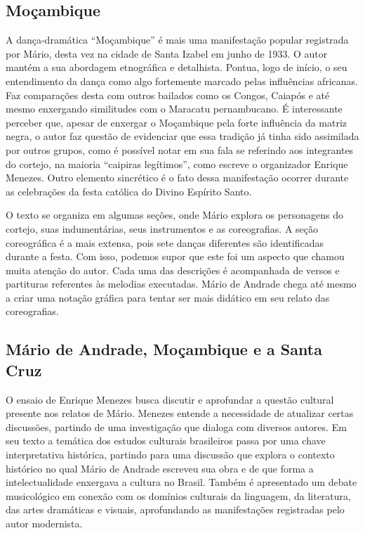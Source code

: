 \subsection{Moçambique}

A dança-dramática ``Moçambique'' é mais uma manifestação popular
registrada por Mário, desta vez na cidade de Santa Izabel em junho de
1933. O autor mantém a sua abordagem etnográfica e detalhista. Pontua,
logo de início, o seu entendimento da dança como algo fortemente marcado
pelas influências africanas. Faz comparações desta com outros bailados
como os Congos, Caiapós e até mesmo enxergando similitudes com o
Maracatu pernambucano. É interessante perceber que, apesar de enxergar o
Moçambique pela forte influência da matriz negra, o autor faz questão de
evidenciar que essa tradição já tinha sido assimilada por outros grupos,
como é possível notar em sua fala se referindo aos integrantes do
cortejo, na maioria ``caipiras
legítimos'', como escreve o organizador Enrique Menezes. Outro elemento sincrético é
o fato dessa manifestação ocorrer durante as celebrações da festa
católica do Divino Espírito Santo.

O texto se organiza em algumas seções, onde Mário explora os personagens
do cortejo, suas indumentárias, seus instrumentos e as coreografias. A
seção coreográfica é a mais extensa, pois sete danças diferentes são
identificadas durante a festa. Com isso, podemos supor que este foi um
aspecto que chamou muita atenção do autor. Cada uma das descrições é
acompanhada de versos e partituras referentes às melodias executadas.
Mário de Andrade chega até mesmo a criar uma notação gráfica para tentar
ser mais didático em seu relato das coreografias.

\subsection{Mário de Andrade, Moçambique e a Santa Cruz}

O ensaio de Enrique Menezes busca discutir e aprofundar a questão
cultural presente nos relatos de Mário. Menezes entende a necessidade de
atualizar certas discussões, partindo de uma investigação que dialoga
com diversos autores. Em seu texto a temática dos estudos culturais
brasileiros passa por uma chave interpretativa histórica, partindo para
uma discussão que explora o contexto histórico no qual Mário de Andrade
escreveu sua obra e de que forma a intelectualidade enxergava a cultura
no Brasil. Também é apresentado um debate musicológico em conexão com os
domínios culturais da linguagem, da literatura, das artes dramáticas e
visuais, aprofundando as manifestações registradas pelo autor
modernista.

